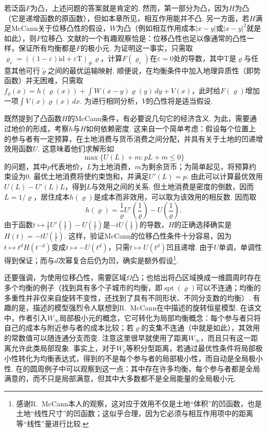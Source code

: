 \label{idx:i42-p282}
若泛函$F$为凸，上述问题的答案就是肯定的. 然而，第一部分为凸，因为$H$为凸（它是递增函数的原函数），但如本章所见，相互作用能并不凸. 另一方面，若$H$满足McCann关于位移凸性的假设，$W$为凸（例如相互作用成本$|x-y|$或$|x-y|^2$就是如此），则$F$位移凸. 文献\cite{b59}的一个有趣观察恰是：位移凸性也足以像通常的凸性一样，保证所有均衡都是$F$的极小元. 为证明这一事实，只需取$\varrho_\varepsilon=((1-\varepsilon)\mathrm{id}+\varepsilon\mathrm T)_\#\varrho$，计算$F(\varrho_\varepsilon)$在$\varepsilon=0$处的导数，其中$\mathrm T$是$\varrho$与任意其他可行$\widetilde\varrho$之间的最优运输映射. 顺便说，在均衡条件中加入地理异质性（即势函数）并无困难，只需取$f_\varrho(x)=h(\varrho(x))+\int W(x-y)\varrho(y)\,dy+V(x)$，此时给$F(\varrho)$增加一项$\int V(x)\varrho(x)\,dx$. 为进行相同分析，$V$的凸性将是适当假设.

既然提到了凸函数$H$的McCann条件，有必要说几句它的经济含义. 为此，需要通过地价的形成，考察$h$与$H$如何依赖密度. 这来自一个简单考虑：假设每个位置上的参与者有一定预算，在土地消费与货币消费之间分配，并具有关于土地的凹递增效用函数$U$. 这意味着他们求解形如
\[
 \max\{U(L)+m:pL+m\leq0\}
\]
的问题，其中$p$代表地价，$L$为土地消费，$m$为剩余货币；为简单起见，将预算约束设为0. 最优土地消费将使约束饱和，并满足$U'(L)=p$. 由此可以计算最优效用$U(L)-U'(L)L$，得到$L$与效用之间的关系. 但土地消费是密度的倒数，因而$L=1/\varrho$，居住成本$h(\varrho)$是成本而非效用，可以取为该效用的相反数. 因而取
\[
 h(\varrho)=\frac1\varrho U'\left(\frac1\varrho\right)
                             -U\left(\frac1\varrho\right).
\]
由于函数$t\mapsto\frac1tU'(\frac1t)-U(\frac1t)$是$-tU(\frac1t)$的导数，$H$的正确选择确实是$H(t)=-tU(\frac1t)$. 这样，验证McCann的位移凸性条件十分容易，因为$t\mapsto t^dH(t^{-d})$变成$t\mapsto-U(t^d)$，只需$t\mapsto U(t^d)$凹且递增. 由于$U$单调，单调性得到保证；而与$d$次幂复合后仍为凹，确实是额外假设\footnote{感谢R.~McCann本人的观察，这对应于效用不仅是土地“体积”的凹函数，也是土地“线性尺寸”的凹函数；这似乎合理，因为它必须与相互作用项中的距离等“线性”量进行比较.}.

还要强调，为使用位移凸性，需要区域$\Omega$凸；\cite{b59}也给出将凸区域换成一维圆周时存在多个均衡的例子（找到具有多个子城市的均衡，即$\operatorname{spt}(\varrho)$可以不连通；均衡的多重性并非仅来自旋转不变性，还找到了具有不同形状、不同分支数的均衡）. 有趣的是，\cite{b59}描述的模型强烈令人联想到R.~McCann在\cite{b232}中描述的旋转恒星模型. 在该文中，作者引入$W_\infty$局部极小元的概念，它可转化为局部均衡概念：每个参与者只将自己的成本与附近参与者的成本比较；若$\varrho$的支集不连通（\cite{b59,b232}中就是如此），其效用的常数值可以随连通分支而变. 注意这里很早就使用了距离$W_\infty$，而且只有这一距离允许此类局部现象. 事实上，对于$W_p$等积分型距离，若通过最优性条件将局部极小性转化为均衡表达式，得到的不是每个参与者的局部极小性，而自动是全局极小性. 在\cite{b59}的圆周例子中可以观察到这一点：其中存在许多均衡，每个参与者都是全局满意的，而不只是局部满意，但其中大多数都不是全局能量的全局极小元.

